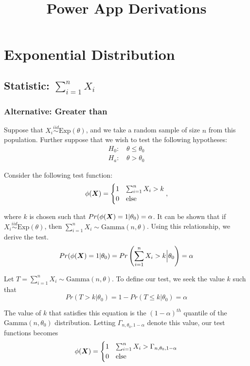 \documentclass[]{article}
\title{Power App Derivations}
\date{}
\newcommand{\bfX}{\mbox{\boldmath $X$}}
\begin{document}
	
\maketitle

\section{Exponential Distribution}

\subsection{Statistic: $\sum_{i=1}^n X_i$}

\subsubsection{Alternative: Greater than}

Suppose that $X_i \stackrel{iid}{\sim} \text{Exp}(\theta)$, and we take a random sample of size $n$ from this population. Further suppose that we wish to test the following hypotheses:
\[
\begin{split}
\text{$H_0$: }& \theta \leq \theta_0 \\
\text{$H_a$: }& \theta > \theta_0
\end{split}
\]

Consider the following test function:
\[
\phi(\bfX) = \begin{cases}
1 & \sum_{i=1}^n X_i > k \\
0 & \text{else}
\end{cases},
\]

where $k$ is chosen such that $Pr(\phi(\bfX) = 1|\theta_0) = \alpha$. It can be shown that if $X_i \stackrel{iid}{\sim} \text{Exp}(\theta)$, then $\sum_{i=1}^{n} X_i \sim \text{Gamma}(n, \theta)$. Using this relationship, we derive the test. 
\[
\begin{split}
Pr(\phi(\bfX) = 1|\theta_0) = Pr\left(\sum_{i=1}^n X_i > k\Big|\theta_0\right) = \alpha 
\end{split}
\]

Let $T = \sum_{i=1}^n X_i \sim \text{Gamma}(n, \theta)$. To define our test, we seek the value $k$ such that 
\[
Pr(T > k | \theta_0) = 1 - Pr(T \leq k | \theta_0) = \alpha
\]

The value of $k$ that satisfies this equation is the $(1 - \alpha)^{th}$ quantile of the $\text{Gamma}(n, \theta_0)$ distribution. Letting $\Gamma_{n, \theta_0, 1-\alpha}$ denote this value, our test functions becomes
\[
\phi(\bfX) = \begin{cases}
1 & \sum_{i=1}^n X_i > \Gamma_{n, \theta_0, 1-\alpha} \\
0 & \text{else}
\end{cases}
\]
\end{document}
